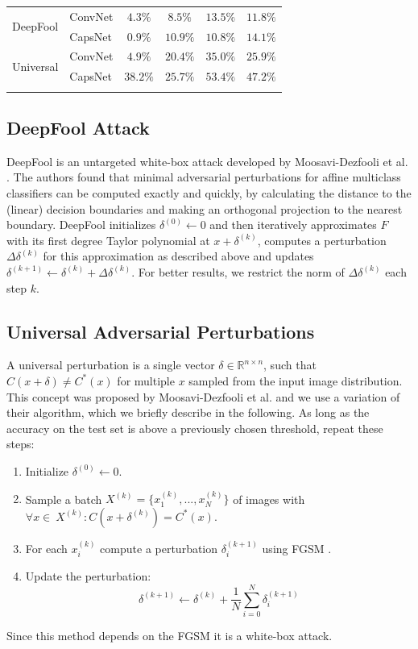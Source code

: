 \documentclass{article}
\begin{document}
\begin{table}[h]
\begin{minipage}{.45\linewidth}
{\begin{tabular}{llcccc}
				\midrule
				\multirow{2}{*}{DeepFool} & ConvNet & $4.3\%$ & $8.5\%$ & $13.5\%$ & $11.8\%$ \\
				& CapsNet           & $0.9\%$ & $10.9\%$ & $10.8\%$ & $14.1\%$ \\
				\midrule
				\multirow{2}{*}{Universal} & ConvNet & $4.9\%$ & $20.4\%$ & $35.0\%$ & $25.9\%$ \\
				& CapsNet           & $38.2\%$ & $25.7\%$ & $53.4\%$ & $47.2\%$ \\
				\bottomrule\\
		\end{tabular}}
		\label{tab:attacks}\end{minipage}
\end{table}


\subsection{DeepFool Attack}
DeepFool is an untargeted white-box attack developed by
Moosavi-Dezfooli et al. .  The authors found that
minimal adversarial perturbations for affine multiclass classifiers can
be computed exactly and quickly, by calculating the distance to the
(linear) decision boundaries and making an orthogonal projection to
the nearest boundary.  DeepFool initializes $\delta^{(0)} \gets 0$ and then
iteratively approximates $F$ with its first degree Taylor polynomial
at $x + \delta^{(k)}$, computes a perturbation $\Delta \delta^{(k)}$
for this approximation as described above and updates
$\delta^{(k+1)} \gets \delta^{(k)} + \Delta \delta^{(k)} $.  For
better results, we restrict the norm of $\Delta \delta^{(k)} $ each
step $k$.

\subsection{Universal Adversarial Perturbations}
\label{sec:universal}
A universal perturbation is a single vector $\delta \in \mathbb{R}^{n\times n}$, such that $C(x + \delta) \neq C^*(x)$ for multiple $x$ sampled from the input image distribution. This concept was proposed by Moosavi-Dezfooli et al.  and we use a variation of their algorithm, which we briefly describe in the following. As long as the accuracy on the test set is above a previously chosen threshold, repeat these steps:
\begin{enumerate}
	\item Initialize $\delta^{(0)} \gets 0$.
	\item Sample a batch $X^{(k)} = \{x_1^{(k)}, ..., x_N^{(k)}\}$ of images with $\forall x \in\ X^{(k)}:  C(x + \delta^{(k)}) = C^*(x)$.
	\item For each $x_i^{(k)}$ compute a perturbation $\delta_i^{(k+1)}$ using FGSM \cite{fgsm}.
	\item Update the perturbation: $$\delta^{(k+1)} \gets \delta^{(k)} + \frac{1}{N} \sum\limits_{i=0}^N \delta_i^{(k+1)}$$
\end{enumerate}
Since this method depends on the FGSM it is a white-box attack.
\end{document}
